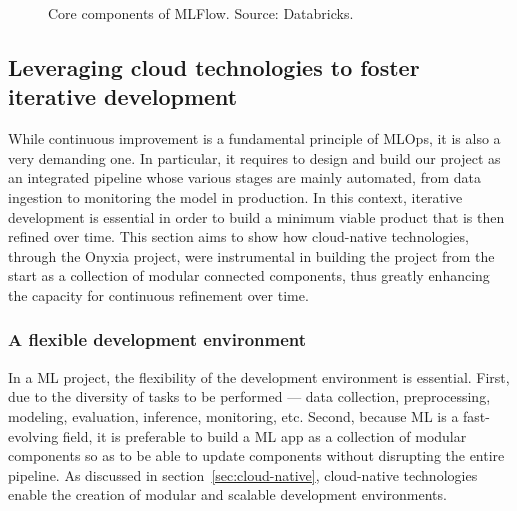 \begin{figure}[htbp]
    \centering
    \caption{Core components of MLFlow. Source: Databricks.}
    \label{fig:mlflow-components}
\end{figure}






\subsection{Leveraging cloud technologies to foster iterative development}

While continuous improvement is a fundamental principle of MLOps, it is also a very demanding one. In particular, it requires to design and build our project as an integrated pipeline whose various stages are mainly automated, from data ingestion to monitoring the model in production. In this context, iterative development is essential in order to build a minimum viable product that is then refined over time. This section aims to show how cloud-native technologies, through the Onyxia project, were instrumental in building the project from the start as a collection of modular connected components, thus greatly enhancing the capacity for continuous refinement over time.

\subsubsection{A flexible development environment}

In a ML project, the flexibility of the development environment is essential. First, due to the diversity of tasks to be performed — data collection, preprocessing, modeling, evaluation, inference, monitoring, etc. Second, because ML is a fast-evolving field, it is preferable to build a ML app as a collection of modular components so as to be able to update components without disrupting the entire pipeline. As discussed in section~\ref{sec:cloud-native}, cloud-native technologies enable the creation of modular and scalable development environments.

